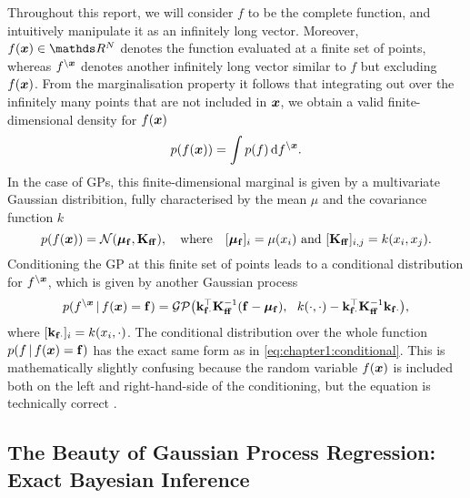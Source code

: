 Throughout this report, we will consider $f$ to be the complete function, and intuitively manipulate it as an infinitely long vector. Moreover, $f(\vx) \in \Reals^N$ denotes the function evaluated at a finite set of points, whereas $f^{\setminus \bm{x}}$ denotes another infinitely long vector similar to $f$ but excluding $f(\bm{x})$. From the marginalisation property it follows that integrating out over the infinitely many points that are not included in $\bm{x}$, we obtain a valid finite-dimensional density for $f(\bm{x})$
\begin{equation}
p(f(\bm{x})) = \int p(f)\,\mathrm{d}{f^{\setminus \bm{x}}}.
\end{equation}
In the case of GPs, this finite-dimensional marginal is given by a multivariate Gaussian distribition, fully characterised by the mean $\mu$ and the covariance function $k$
\begin{equation} 
  p(f(\vx)) = \NormDist{\vmu_{\vf}, \Kff},\quad\text{where}\quad [\vmu_\vf]_{i} = \mu(x_i)\ \text{and}\ [\Kff]_{i,j} = k(x_i, x_j).
\end{equation}
Conditioning the GP at this finite set of points leads to a conditional distribution for $f^{\setminus \bm{x}}$, which is given by another Gaussian process
\begin{equation}
  \label{eq:chapter1:conditional}
  p(f^{\setminus \bm{x}} \,|\, f(\bm{x}) = \mathbf{f}) = \mathcal{GP}\big(\mathbf{k}_{\mathbf{f} \cdot}^\top \mathbf{{K}}_{\mathbf{f} \mathbf{f}}^{-1} (\mathbf{f} - \boldsymbol{\mu}_{\mathbf{f}}),\ \ k(\cdot, \cdot) -  \mathbf{k}_{\mathbf{f} \cdot}^\top \mathbf{{K}}_{\mathbf{f} \mathbf{f}}^{-1} \mathbf{k}_{\mathbf{f} \cdot}\big),
\end{equation}
where $[\mathbf{k}_{\mathbf{f} \cdot}]_i = k(x_i, \cdot)$. The conditional distribution over the whole function $p(f \,|\, f(\bm{x}) = \mathbf{f})$ has the exact same form as in \cref{eq:chapter1:conditional}. This is mathematically slightly confusing because the random variable $f(\bm{x})$ is included both on the left and right-hand-side of the conditioning, but the equation is technically correct \citep{matthews16}.

\subsection{The Beauty of Gaussian Process Regression: Exact Bayesian Inference}

